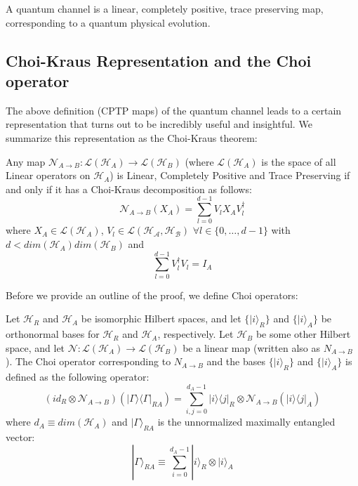 \begin{definition}
    A quantum channel is a linear, completely positive, trace preserving map, corresponding to a quantum physical evolution.
\end{definition}

\subsection{Choi-Kraus Representation and the Choi operator}

The above definition (CPTP maps) of the quantum channel leads to a certain representation that turns
out to be incredibly useful and insightful. We summarize this representation as the Choi-Kraus theorem:
\begin{theorem}
    Any map $\mathcal{N}_{A\rightarrow B}:\mathcal{L}(\mathcal{H}_A) \rightarrow \mathcal{L}(\mathcal{H}_B)$
    (where $\mathcal{L}(\mathcal{H}_A)$ is the space of all Linear operators on $\mathcal{H}_A$) is Linear,
    Completely Positive and Trace Preserving if and only if it has a Choi-Kraus decomposition as follows:
    \begin{equation}
        \mathcal{N}_{A \rightarrow B}(X_A) = \displaystyle\sum_{l=0}^{d-1} V_l X_A V_l^\dagger
    \end{equation}
    where $X_A \in \mathcal{L}(\mathcal{H}_A)$, $V_l \in \mathcal{L}(\mathcal{H_A}, \mathcal{H_B})$ 
    $\forall l \in \{0,\dots,d-1\}$ with $d < dim(\mathcal{H}_A)dim(\mathcal{H}_B)$ and
    \begin{equation}
        \displaystyle\sum_{l=0}^{d-1} V_l^\dagger V_l = I_A
    \end{equation}
\end{theorem}

Before we provide an outline of the proof, we define Choi operators:

\begin{definition}
    Let $\mathcal{H}_R$ and $\mathcal{H}_A$ be isomorphic Hilbert spaces, and let
    $\{| i\rangle_R \}$ and $\{|i\rangle_A \}$ be orthonormal bases for $\mathcal{H}_R$
    and $\mathcal{H}_A$, respectively. Let $\mathcal{H}_B$ be some other Hilbert space,
    and let $\mathcal{N} : \mathcal{L}(\mathcal{H}_A) \rightarrow \mathcal{L}(\mathcal{H}_B)$
    be a linear map (written also as $N_{A\rightarrow B}$). The Choi operator corresponding
    to $N_{A\rightarrow B}$ and the bases $\{| i\rangle_R \}$ and $\{|i\rangle_A \}$ is defined
    as the following operator:
    \begin{equation}
        (id_R \otimes \mathcal{N}_{A \rightarrow B})(| \Gamma \rangle\langle \Gamma |_{RA})
        = \displaystyle\sum_{i,j = 0}^{d_A-1}| i \rangle\langle j |_R \otimes \mathcal{N}_{A \rightarrow B}(| i \rangle\langle j |_A)
    \end{equation}
    where $d_A \equiv dim(\mathcal{H}_A)$ and $| \Gamma \rangle_{RA}$ is the unnormalized maximally entangled vector:
    \begin{equation}
        | \Gamma \rangle_{RA} \equiv \displaystyle\sum_{i=0}^{d_A - 1} | i \rangle_R \otimes | i \rangle_A
    \end{equation}
\end{definition}

